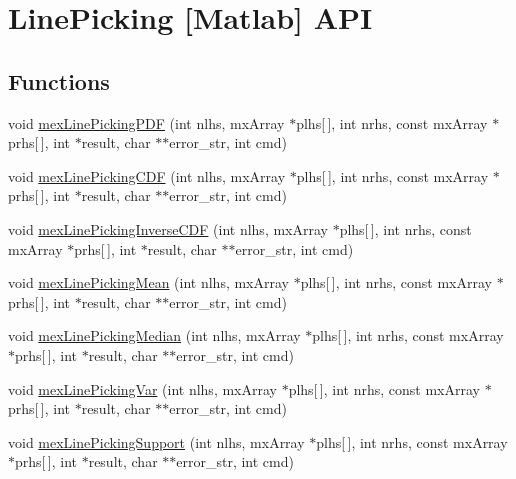 \hypertarget{group__matlabapi}{\section{Line\-Picking \mbox{[}Matlab\mbox{]} A\-P\-I}
\label{group__matlabapi}
}
\subsection*{Functions}
\begin{DoxyCompactItemize}
\item 
void \hyperlink{group__matlabapi_ga415ab39c370dfeb66324d1a538a8bb7b}{mex\-Line\-Picking\-P\-D\-F} (int nlhs, mx\-Array $\ast$plhs\mbox{[}$\,$\mbox{]}, int nrhs, const mx\-Array $\ast$prhs\mbox{[}$\,$\mbox{]}, int $\ast$result, char $\ast$$\ast$error\-\_\-str, int cmd)
\item 
void \hyperlink{group__matlabapi_ga565be7534fefd6e5547869fdcb21b36f}{mex\-Line\-Picking\-C\-D\-F} (int nlhs, mx\-Array $\ast$plhs\mbox{[}$\,$\mbox{]}, int nrhs, const mx\-Array $\ast$prhs\mbox{[}$\,$\mbox{]}, int $\ast$result, char $\ast$$\ast$error\-\_\-str, int cmd)
\item 
void \hyperlink{group__matlabapi_ga7f5402e478356fda7514c795d131ecfc}{mex\-Line\-Picking\-Inverse\-C\-D\-F} (int nlhs, mx\-Array $\ast$plhs\mbox{[}$\,$\mbox{]}, int nrhs, const mx\-Array $\ast$prhs\mbox{[}$\,$\mbox{]}, int $\ast$result, char $\ast$$\ast$error\-\_\-str, int cmd)
\item 
void \hyperlink{group__matlabapi_ga6fe54a6aa7e3d2e51733dea1a443a1b2}{mex\-Line\-Picking\-Mean} (int nlhs, mx\-Array $\ast$plhs\mbox{[}$\,$\mbox{]}, int nrhs, const mx\-Array $\ast$prhs\mbox{[}$\,$\mbox{]}, int $\ast$result, char $\ast$$\ast$error\-\_\-str, int cmd)
\item 
void \hyperlink{group__matlabapi_ga8324c9ba8352696a66ca32b4ddd289f8}{mex\-Line\-Picking\-Median} (int nlhs, mx\-Array $\ast$plhs\mbox{[}$\,$\mbox{]}, int nrhs, const mx\-Array $\ast$prhs\mbox{[}$\,$\mbox{]}, int $\ast$result, char $\ast$$\ast$error\-\_\-str, int cmd)
\item 
void \hyperlink{group__matlabapi_gaceb40f4eec3174186785fca28818c09f}{mex\-Line\-Picking\-Var} (int nlhs, mx\-Array $\ast$plhs\mbox{[}$\,$\mbox{]}, int nrhs, const mx\-Array $\ast$prhs\mbox{[}$\,$\mbox{]}, int $\ast$result, char $\ast$$\ast$error\-\_\-str, int cmd)
\item 
void \hyperlink{group__matlabapi_gaa1d58f45751e79cccbc82eedccef460e}{mex\-Line\-Picking\-Support} (int nlhs, mx\-Array $\ast$plhs\mbox{[}$\,$\mbox{]}, int nrhs, const mx\-Array $\ast$prhs\mbox{[}$\,$\mbox{]}, int $\ast$result, char $\ast$$\ast$error\-\_\-str, int cmd)
$$
\end{DoxyCompactItemize}

